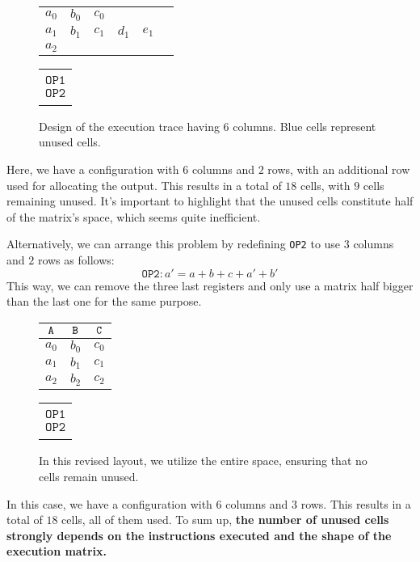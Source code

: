 \begin{figure}[H]
\centering
\begin{tabular}{|c|c|c|c|c|c|}\hline
\A & \B & \C & \D & \E & \F \\ \hline
$a_0$ & $b_0$ & $c_0$ & \cellcolor{cyan} & \cellcolor{cyan} & \cellcolor{cyan} \\ \hline
$a_1$ & $b_1$ & $c_1$ & $d_1$ & $e_1$ & \cellcolor{cyan} \\ \hline
\cellcolor{green} $a_2$ & \cellcolor{cyan} & \cellcolor{cyan} & \cellcolor{cyan} & \cellcolor{cyan} & \cellcolor{cyan} \\ \hline
\end{tabular}
\hspace{1em}
\begin{tabular}{c}
$             $ \\
$\mathtt{OP1}$ \\
$\mathtt{OP2}$ \\
$             $
\end{tabular}
\caption{Design of the execution trace having $6$ columns. Blue cells represent unused cells. }
\label{fig:shape-first-design}
\end{figure}

Here, we have a configuration with $6$ columns and $2$ rows, with an additional row used for allocating the output. This results in a total of $18$ cells, with $9$ cells remaining unused. It's important to highlight that the unused cells constitute half of the matrix's space, which seems quite inefficient.


Alternatively, we can arrange this problem by redefining \texttt{OP2} to use $3$ columns and $2$ rows as follows:
\[
\texttt{OP2}: a'=a+b+c+a'+b'
\]
This way, we can remove the three last registers and only use a matrix half bigger than the last one for the same purpose.


\begin{figure}[H]
\centering
\begin{tabular}{|c|c|c|}\hline
  $\mathtt{A}$ & $\mathtt{B}$ & $\mathtt{C}$ \\ \hline
  $a_0$ & $b_0$ & $c_0$ \\ \hline
  $a_1$ & $b_1$ & $c_1$ \\ \hline
  $a_2$ & $b_2$ & \cellcolor{green}$c_2$ \\ \hline
\end{tabular}
\begin{tabular}{c}
   $            $ \\
   $\mathtt{OP1}$ \\
   $\mathtt{OP2}$ \\
   $            $
\end{tabular}
\caption{In this revised layout, we utilize the entire space, ensuring that no cells remain unused. }
\label{fig:shape-second-design}
\end{figure}

In this case, we have a configuration with $6$ columns and $3$ rows. This results in a total of $18$ cells, all of them used. To sum up, \textbf{the number of unused cells strongly depends on the instructions executed and the shape of the execution matrix. }



